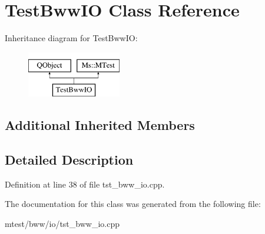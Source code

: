 \hypertarget{class_test_bww_i_o}{}\section{Test\+Bww\+IO Class Reference}
\label{class_test_bww_i_o}
Inheritance diagram for Test\+Bww\+IO\+:\begin{figure}[H]
\begin{center}
\leavevmode
\includegraphics[height=2.000000cm]{class_test_bww_i_o}
\end{center}
\end{figure}
\subsection*{Additional Inherited Members}


\subsection{Detailed Description}


Definition at line 38 of file tst\+\_\+bww\+\_\+io.\+cpp.



The documentation for this class was generated from the following file\+:\begin{DoxyCompactItemize}
\item 
mtest/bww/io/tst\+\_\+bww\+\_\+io.\+cpp\end{DoxyCompactItemize}
